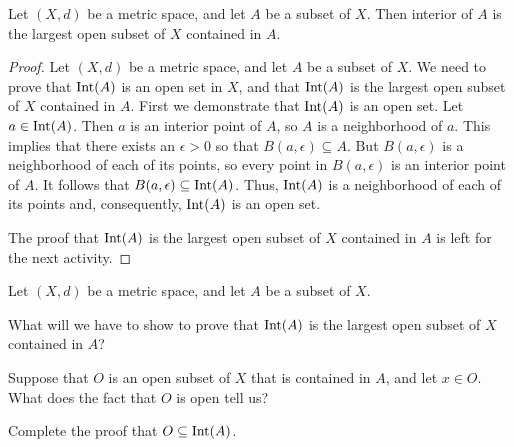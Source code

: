 \begin{theorem} \label{thm:Interior_MS} Let $(X,d)$ be a metric space, and let $A$ be a subset of $X$. Then interior of $A$ is the largest open subset of $X$ contained in $A$.  
\end{theorem}

\begin{proof} Let $(X,d)$ be a metric space, and let $A$ be a subset of $X$. We need to prove that $\text{Int}(A)$ is an open set in $X$, and that $\text{Int}(A)$ is the largest open subset of $X$ contained in $A$. First we demonstrate that $\text{Int}(A)$ is an open set. Let $a \in \text{Int}(A)$. Then $a$ is an interior point of $A$, so $A$ is a neighborhood of $a$. This implies that there exists an $\epsilon > 0$ so that $B(a, \epsilon) \subseteq A$. But $B(a, \epsilon)$ is a neighborhood of each of its points, so every point in $B(a, \epsilon)$ is an interior point of $A$. It follows that $B(a, \epsilon) \subseteq \text{Int}(A)$. Thus, $\text{Int}(A)$ is a neighborhood of each of its points and, consequently, $\text{Int}(A)$ is an open set. 

The proof that $\text{Int}(A)$ is the largest open subset of $X$ contained in $A$ is left for the next activity.
\end{proof}

\begin{activity} Let $(X,d)$ be a metric space, and let $A$ be a subset of $X$. 
\ba
\item What will we have to show to prove that $\text{Int}(A)$ is the largest open subset of $X$ contained in $A$?

\item Suppose that $O$ is an open subset of $X$ that is contained in $A$, and let $x \in O$. What does the fact that $O$ is open tell us?

\item Complete the proof that $O \subseteq \text{Int}(A)$.

\ea

\end{activity}


\begin{comment}

\ActivitySolution

\ba
\item We need to prove that any open subset of $X$ that is contained in $A$ is a subset of $\Int(A)$.

\item The fact that $O$ is an open set tells us that there exists an open ball $B$ centered at $x$ that is contained in $O$. 

\item Then $B \subseteq A$ and $A$ is a neighborhood of $x$. So $x \in \Int(A)$. Therefore, $O \subseteq \Int(A)$ and $\Int(A)$ is the largest open subset of $X$ contained in $A$. 

\ea

\end{comment}

